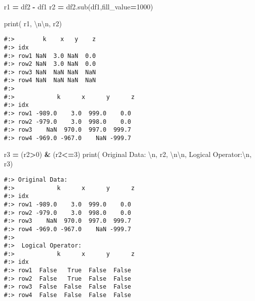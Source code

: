\documentclass[
]{book}
\newenvironment{Shaded}{\begin{snugshade}}{\end{snugshade}}
\newcommand{\BuiltInTok}[1]{#1}
\newcommand{\CharTok}[1]{\textcolor[rgb]{0.5,0.5,0.5}{#1}}
\newcommand{\DecValTok}[1]{\textcolor[rgb]{0.06,0.06,0.06}{#1}}
\newcommand{\NormalTok}[1]{#1}
\newcommand{\OperatorTok}[1]{\textcolor[rgb]{0.43,0.43,0.43}{\textbf{#1}}}
\newcommand{\StringTok}[1]{\textcolor[rgb]{0.5,0.5,0.5}{#1}}
\begin{document}
\begin{Shaded}
\begin{Highlighting}[]
\NormalTok{r1 }\OperatorTok{=}\NormalTok{ df2 }\OperatorTok{{-}}\NormalTok{ df1}
\NormalTok{r2 }\OperatorTok{=}\NormalTok{ df2.sub(df1,fill\_value}\OperatorTok{=}\DecValTok{1000}\NormalTok{)}

\BuiltInTok{print}\NormalTok{( r1, }\StringTok{\textquotesingle{}}\CharTok{\textbackslash{}n\textbackslash{}n}\StringTok{\textquotesingle{}}\NormalTok{, r2)}
\end{Highlighting}
\end{Shaded}

\begin{verbatim}
#:>        k    x   y    z
#:> idx                   
#:> row1 NaN  3.0 NaN  0.0
#:> row2 NaN  3.0 NaN  0.0
#:> row3 NaN  NaN NaN  NaN
#:> row4 NaN  NaN NaN  NaN 
#:> 
#:>            k      x      y      z
#:> idx                             
#:> row1 -989.0    3.0  999.0    0.0
#:> row2 -979.0    3.0  998.0    0.0
#:> row3    NaN  970.0  997.0  999.7
#:> row4 -969.0 -967.0    NaN -999.7
\end{verbatim}

\begin{Shaded}
\begin{Highlighting}[]
\NormalTok{r3 }\OperatorTok{=}\NormalTok{ (r2}\OperatorTok{\textgreater{}}\DecValTok{0}\NormalTok{) }\OperatorTok{\&}\NormalTok{ (r2}\OperatorTok{\textless{}=}\DecValTok{3}\NormalTok{)}
\BuiltInTok{print}\NormalTok{( }\StringTok{\textquotesingle{}Original Data: }\CharTok{\textbackslash{}n}\StringTok{\textquotesingle{}}\NormalTok{, r2, }\StringTok{\textquotesingle{}}\CharTok{\textbackslash{}n\textbackslash{}n}\StringTok{\textquotesingle{}}\NormalTok{,}
       \StringTok{\textquotesingle{}Logical Operator:}\CharTok{\textbackslash{}n}\StringTok{\textquotesingle{}}\NormalTok{, r3)}
\end{Highlighting}
\end{Shaded}

\begin{verbatim}
#:> Original Data: 
#:>            k      x      y      z
#:> idx                             
#:> row1 -989.0    3.0  999.0    0.0
#:> row2 -979.0    3.0  998.0    0.0
#:> row3    NaN  970.0  997.0  999.7
#:> row4 -969.0 -967.0    NaN -999.7 
#:> 
#:>  Logical Operator:
#:>            k      x      y      z
#:> idx                             
#:> row1  False   True  False  False
#:> row2  False   True  False  False
#:> row3  False  False  False  False
#:> row4  False  False  False  False
\end{verbatim}
\end{document}
